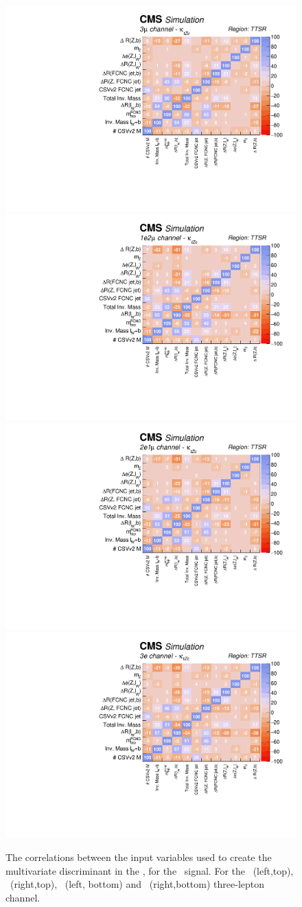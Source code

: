\begin{figure}[htbp]
	\centering
	\includegraphics[width=0.49\linewidth]{6_Search/Figures/PlotsTechnics/correlationsigZcttoppairuuu}
	\includegraphics[width=0.49\linewidth]{6_Search/Figures/PlotsTechnics/correlationsigZcttoppairuue}
	\includegraphics[width=0.49\linewidth]{6_Search/Figures/PlotsTechnics/correlationsigZcttoppaireeu}
	\includegraphics[width=0.49\linewidth]{6_Search/Figures/PlotsTechnics/correlationsigZcttoppaireee}
	\caption{The correlations between the input variables used to create the multivariate discriminant in the \TTSR, for the \Zct\ signal. For the \mumumu\ (left,top), \emumu\ (right,top), \eemu\ (left, bottom) and \eee\ (right,bottom) three-lepton channel.}
	\label{fig:correlationsigzcttoppaier}
\end{figure}

